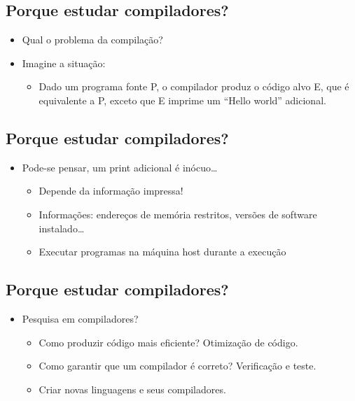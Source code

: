 \documentclass[11pt]{article}
\begin{document}
\subsection*{Porque estudar compiladores?}
\label{sec:org7c2d747}

\begin{itemize}
\item Qual o problema da compilação?

\item Imagine a situação:
\begin{itemize}
\item Dado um programa fonte P, o compilador produz o código alvo E, que é equivalente a P, exceto que E imprime um ``Hello world'' adicional.
\end{itemize}
\end{itemize}
\subsection*{Porque estudar compiladores?}
\label{sec:org259090c}

\begin{itemize}
\item Pode-se pensar, um print adicional é inócuo\ldots{}
\begin{itemize}
\item Depende da informação impressa!
\item Informações: endereços de memória restritos, versões de software instalado\ldots{}
\item Executar programas na máquina host durante a execução
\end{itemize}
\end{itemize}
\subsection*{Porque estudar compiladores?}
\label{sec:orgce5059e}

\begin{itemize}
\item Pesquisa em compiladores?
\begin{itemize}
\item Como produzir código mais eficiente? Otimização de código.
\item Como garantir que um compilador é correto? Verificação e teste.
\item Criar novas linguagens e seus compiladores.
\end{itemize}
\end{itemize}
\end{document}
